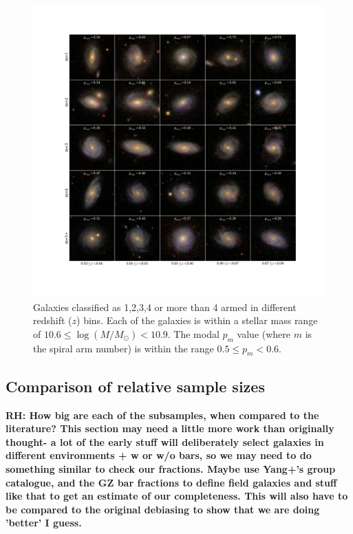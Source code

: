 \documentclass[useAMS,usenatbib]{mn2e}
\newcommand{\rh}[1]{{\bf \textcolor{RoyalPurple}{RH: #1}}}
\begin{document}
\begin{figure}
		\centering

        \includegraphics[width=1\textwidth]{Data_imgs/image_panel.pdf}

        \caption{Galaxies classified as 1,2,3,4 or more than 4 armed in different redshift ($z$) bins. Each of the galaxies is within a stellar mass range of $10.6 \leq \log(M/M_{\odot}) < 10.9$. The modal $p_m$ value (where $m$ is the spiral arm number) is within the range $0.5 \leq p_m < 0.6$.}

        \label{fig:image_panel}

\end{figure}

\subsection{Comparison of relative sample sizes}

\rh{How big are each of the subsamples, when compared to the literature? This section may need a little more work than originally thought- a lot of the early stuff will deliberately select galaxies in different environments + w or w/o bars, so we may need to do something similar to check our fractions. Maybe use Yang+'s group catalogue, and the GZ bar fractions to define field galaxies and stuff like that to get an estimate of our completeness. This will also have to be compared to the original debiasing to show that we are doing 'better' I guess.}
\end{document}
